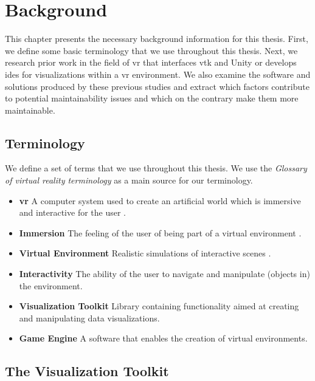 \chapter{Background}
\label{ch:background}

This chapter presents the necessary background information for this thesis. First, we define some basic terminology that we use throughout this thesis. Next, we research prior work in the field of \acrshort{vr} that interfaces \acrshort{vtk} and Unity or develops \acrshort{ide}s for visualizations within a \acrshort{vr} environment. We also examine the software and solutions produced by these previous studies and extract which factors contribute to potential maintainability issues and which on the contrary make them more maintainable. 

\section{Terminology}

We define a set of terms that we use throughout this thesis. We use the \textit{Glossary of virtual reality terminology} \cite{manetta1995glossary} as a main source for our terminology.

\begin{itemize}[leftmargin=1.5truecm]
    \setlength{\itemindent}{-1truecm}
    \item[] \textbf{\acrfull{vr}} A computer system used to create an artificial world which is immersive and interactive for the user \cite{manetta1995glossary}.
    \item[] \textbf{Immersion} The feeling of the user of being part of a virtual environment \cite{manetta1995glossary}.
    \item[] \textbf{Virtual Environment} Realistic simulations of interactive scenes \cite{manetta1995glossary}.
    \item[] \textbf{Interactivity} The ability of the user to navigate and manipulate (objects in) the environment.
    \item[] \textbf{Visualization Toolkit} Library containing functionality aimed at creating and manipulating data visualizations.
    \item[] \textbf{Game Engine} A software that enables the creation of virtual environments.
\end{itemize}

\section{The Visualization Toolkit}

